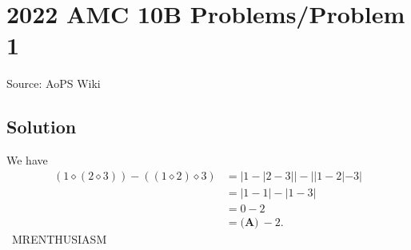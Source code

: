 \documentclass[12pt]{article}
\begin{document}
\section*{{2022 AMC 10B Problems/Problem 1}}
Source: AoPS Wiki

\subsection*{Solution}
We have \begin{align*} (1\diamond(2\diamond3))-((1\diamond2)\diamond3) &= |1-|2-3|| - ||1-2|-3| \\ &= |1-1| - |1-3| \\ &= 0-2 \\ &= \boxed{\textbf{(A)}\ {-}2}. \end{align*} ~MRENTHUSIASM
\end{document}
